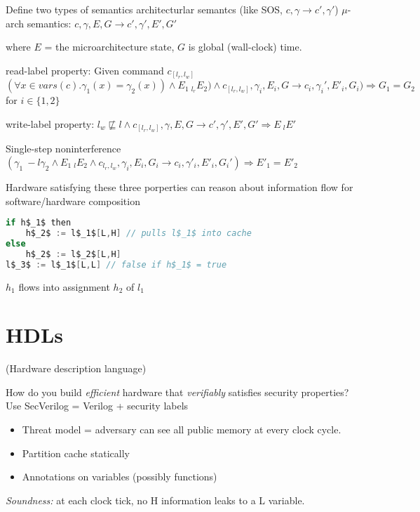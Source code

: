 \documentclass{article}
\begin{document}
Define two types of semantics
architecturlar semantcs (like SOS, $c,\gamma \longrightarrow c',\gamma'$)
$\mu$-arch semantics: $c,\gamma,E,G \longrightarrow c',\gamma',E',G'$

where $E$ =  the microarchitecture state, $G$ is global (wall-clock) time.
 
read-label property: Given command $c_[l_r,l_w]$
$(\forall x \in vars(c) . \gamma_1(x) = \gamma_2(x)) \land E_1 ~_{l_r} E_2) \land c_[l_r,l_w],\gamma_i,E_i,G \longrightarrow c_i,\gamma_i',E'_i,G_i)  \Rightarrow G_1 = G_2$ for $i \in 
\{1,2\}$

write-label property: $l_w \not\sqsubseteq l \land c_{[l_r,l_w]}, \gamma,E,G \longrightarrow c', \gamma',E',G' \Rightarrow E ~_l E' $

Single-step noninterference
$(\gamma_1 ~-l \gamma_2 \land E_1 ~_l E_2 \land c_{l_r,l_w},\gamma_i,E_i,G_i \longrightarrow c_i,\gamma'_i,E'_i,G_i') \Rightarrow E'_1 = E'_2$

Hardware satisfying these three porperties can reason about information flow for software/hardware composition

\begin{lstlisting}[mathescape,frame=single,basicstyle=\ttfamily,language=java]
if h$_1$ then
    h$_2$ := l$_1$[L,H] // pulls l$_1$ into cache
else 
    h$_2$ := l$_2$[L,H]
l$_3$ := l$_1$[L,L] // false if h$_1$ = true
\end{lstlisting}
$h_1$ flows into assignment $h_2$ of $l_1$

\section{HDLs}
(Hardware description language)

How do you build \emph{efficient} hardware that \emph{verifiably} satisfies security properties?
Use SecVerilog = Verilog + security labels

\begin{itemize}
\item Threat model = adversary can see all public memory at every clock cycle.

\item Partition cache statically

\item Annotations on variables (possibly functions)
  
\end{itemize}

\emph{Soundness:} at each clock tick, no H information leaks to a L variable.
  
\end{document}

